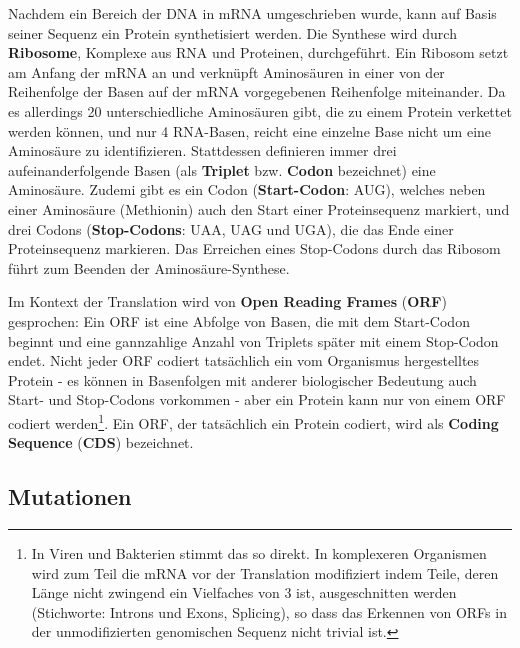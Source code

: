 Nachdem ein Bereich der DNA in mRNA umgeschrieben wurde, kann auf Basis seiner Sequenz ein Protein synthetisiert werden. Die Synthese wird durch \textbf{Ribosome}, Komplexe aus RNA und Proteinen, durchgeführt. Ein Ribosom setzt am Anfang der mRNA an und verknüpft Aminosäuren in einer von der Reihenfolge der Basen auf der mRNA vorgegebenen Reihenfolge miteinander. Da es allerdings 20 unterschiedliche Aminosäuren gibt, die zu einem Protein verkettet werden können, und nur 4 RNA-Basen, reicht eine einzelne Base nicht um eine Aminosäure zu identifizieren. Stattdessen definieren immer drei aufeinanderfolgende Basen (als \textbf{Triplet} bzw. \textbf{Codon} bezeichnet) eine Aminosäure. Zudemi gibt es ein Codon (\textbf{Start-Codon}: AUG), welches neben einer Aminosäure (Methionin) auch den Start einer Proteinsequenz markiert, und drei Codons (\textbf{Stop-Codons}: UAA, UAG und UGA), die das Ende einer Proteinsequenz markieren. Das Erreichen eines Stop-Codons durch das Ribosom führt zum Beenden der Aminosäure-Synthese. 

Im Kontext der Translation wird von \textbf{Open Reading Frames} (\textbf{ORF}) gesprochen: Ein ORF ist eine Abfolge von Basen, die mit dem Start-Codon beginnt und eine gannzahlige Anzahl von Triplets später mit einem Stop-Codon endet. Nicht jeder ORF codiert tatsächlich ein vom Organismus hergestelltes Protein - es können in Basenfolgen mit anderer biologischer Bedeutung auch Start- und Stop-Codons vorkommen - aber ein Protein kann nur von einem ORF codiert werden\footnote{In Viren und Bakterien stimmt das so direkt. In komplexeren Organismen wird zum Teil die mRNA vor der Translation modifiziert indem Teile, deren Länge nicht zwingend ein Vielfaches von 3 ist, ausgeschnitten werden (Stichworte: Introns und Exons, Splicing), so dass das Erkennen von ORFs in der unmodifizierten genomischen Sequenz nicht trivial ist.}. Ein ORF, der tatsächlich ein Protein codiert, wird als \textbf{Coding Sequence} (\textbf{CDS}) bezeichnet. 

\subsection{Mutationen}

